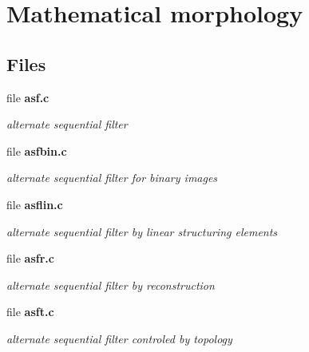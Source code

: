\section{Mathematical morphology}
\label{group__morpho}
\subsection*{Files}
\begin{DoxyCompactItemize}
\item 
file {\bf asf.c}


\begin{DoxyCompactList}\small\item\em alternate sequential filter \item\end{DoxyCompactList}

\item 
file {\bf asfbin.c}


\begin{DoxyCompactList}\small\item\em alternate sequential filter for binary images \item\end{DoxyCompactList}

\item 
file {\bf asflin.c}


\begin{DoxyCompactList}\small\item\em alternate sequential filter by linear structuring elements \item\end{DoxyCompactList}

\item 
file {\bf asfr.c}


\begin{DoxyCompactList}\small\item\em alternate sequential filter by reconstruction \item\end{DoxyCompactList}

\item 
file {\bf asft.c}


\begin{DoxyCompactList}\small\item\em alternate sequential filter controled by topology \item\end{DoxyCompactList}


\end{DoxyCompactItemize}
